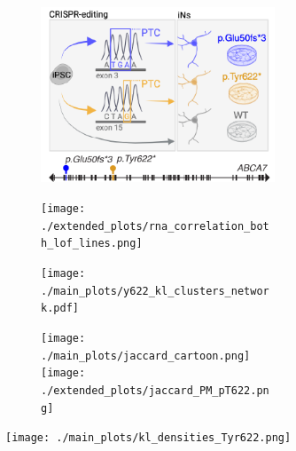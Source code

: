 \begin{figure}[ht]
    \begin{subfigure}[t]{.25\textwidth}
        \begin{subfigure}[t]{\textwidth}
            \caption{}
            \includegraphics[width=\textwidth]{./main_plots/iN_cartoon.png}        
        \end{subfigure} 
        \begin{subfigure}[t]{\textwidth}
            \caption{}
            \texttt{[image: ./extended\_plots/rna\_correlation\_both\_lof\_lines.png]}        
        \end{subfigure} 
    \end{subfigure} 
    \begin{subfigure}[t]{.25\textwidth}
        \begin{subfigure}[t]{\textwidth}
            \caption{}
            \texttt{[image: ./main\_plots/y622\_kl\_clusters\_network.pdf]}        
        \end{subfigure}
        \begin{subfigure}[t]{\textwidth}
            \caption{}
            \centering
            \texttt{[image: ./main\_plots/jaccard\_cartoon.png]}        
            \texttt{[image: ./extended\_plots/jaccard\_PM\_pT622.png]}        
        \end{subfigure}  
    \end{subfigure} 
    \begin{subfigure}[t]{.5\textwidth}
        \caption{}
        \texttt{[image: ./main\_plots/kl\_densities\_Tyr622.png]}        
    \end{subfigure}  

\end{figure}
